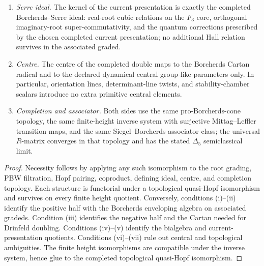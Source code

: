 \begin{theorem}
\begin{enumerate}[label=\textup{(\roman*)}]
$\Delta_5$-regulated Lie bialgebra cobracket, and its associated graded
reduces to the primitive enveloping coproduct of
Theorem~\ref{thm:k3e-bkm-finite-core}.
\item \emph{Serre ideal.} The kernel of the current presentation is exactly
the completed Borcherds--Serre ideal: real-root cubic relations on the
$F_3$ core, orthogonal imaginary-root super-commutativity, and the
quantum corrections prescribed by the chosen completed current
presentation; no additional Hall relation survives in the associated
graded.
\item \emph{Centre.} The centre of the completed double maps to the
Borcherds Cartan radical and to the declared dynamical central
group-like parameters only. In particular, orientation lines,
determinant-line twists, and stability-chamber scalars introduce no
extra primitive central elements.
\item \emph{Completion and associator.} Both sides use the same
pro-Borcherds-cone topology, the same finite-height inverse system with
surjective Mittag--Leffler transition maps, and the same
Siegel--Borcherds associator class; the universal $R$-matrix converges
in that topology and has the stated $\Delta_5$ semiclassical limit.
\end{enumerate}
\end{theorem}

\begin{proof}
Necessity follows by applying any such isomorphism to the root grading,
PBW filtration, Hopf pairing, coproduct, defining ideal, centre, and
completion topology. Each structure is functorial under a topological
quasi-Hopf isomorphism and survives on every finite height quotient.
Conversely, conditions \textup{(i)}--\textup{(ii)} identify the positive
half with the Borcherds enveloping algebra on associated gradeds.
Condition \textup{(iii)} identifies the negative half and the Cartan
needed for Drinfeld doubling. Conditions \textup{(iv)}--\textup{(v)}
identify the bialgebra and current-presentation quotients. Conditions
\textup{(vi)}--\textup{(vii)} rule out central and topological
ambiguities. The finite height isomorphisms are compatible under the
inverse system, hence glue to the completed topological quasi-Hopf
isomorphism.
\end{proof}


